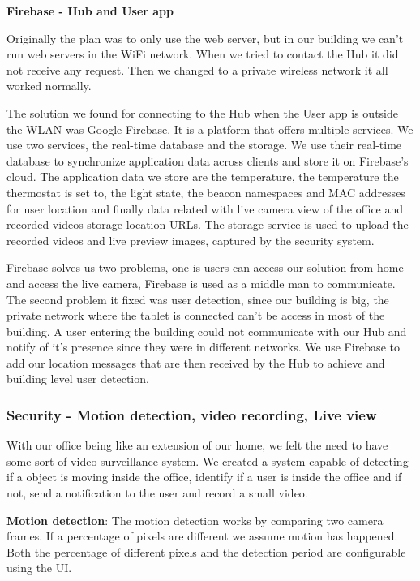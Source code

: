 \documentclass[conference]{IEEEtran}
\begin{document}
\textbf{Firebase - Hub and User app}

Originally the plan was to only use the web server, but in our building we can't run web servers in the WiFi network. When we tried to contact the Hub it did not receive any request. Then we changed to a private wireless network it all worked normally.

The solution we found for connecting  to the Hub when the User app is outside the \ac{WLAN} was Google Firebase. It is a platform that offers multiple services. We use two services, the real-time database and the storage.
We use their real-time database to synchronize application data across clients and store it on Firebase's cloud. The application data we store are the temperature, the temperature the thermostat is set to, the light state, the beacon namespaces and MAC addresses for user location and finally data related with live camera view of the office and recorded videos storage location URLs. The storage service is used to upload the recorded videos and live preview images, captured by the security system.

Firebase solves us two problems, one is users can access our solution from home and access the live camera, Firebase is used as a middle man to communicate. The second problem it fixed was user detection, since our building is big, the private network where the tablet is connected can't be access in most of the building. A user entering the building could not communicate with our Hub and notify of it's presence since they were in different networks. We use Firebase to add our location messages that are then received by the Hub to achieve and building level user detection.

\subsubsection{Security - Motion detection, video recording, Live view}\label{imp:security_motion}

With our office being like an extension of our home, we felt the need to have some sort of video surveillance system. We created a system capable of detecting if a object is moving inside the office, identify if a user is inside the office and if not, send a notification to the user and record a small video.

\textbf{Motion detection}: The motion detection works by comparing two camera frames. If a percentage of pixels are different we assume motion has happened. Both the percentage of different pixels and the detection period are configurable using the \ac{UI}.
\end{document}
